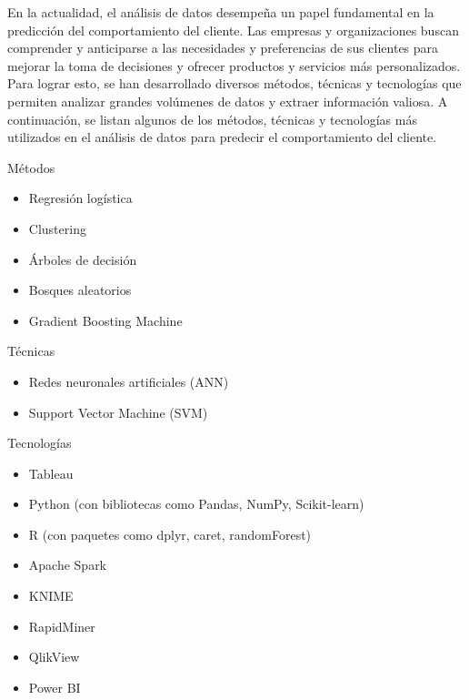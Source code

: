 En la actualidad, el análisis de datos desempeña un papel fundamental en la predicción del comportamiento del cliente. Las empresas y organizaciones buscan comprender y anticiparse a las necesidades y preferencias de sus clientes para mejorar la toma de decisiones y ofrecer productos y servicios más personalizados. Para lograr esto, se han desarrollado diversos métodos, técnicas y tecnologías que permiten analizar grandes volúmenes de datos y extraer información valiosa. 
A continuación, se listan algunos de los métodos, técnicas y tecnologías más utilizados en el análisis de datos para predecir el comportamiento del cliente.

Métodos 
\begin{itemize}
    \item Regresión logística
    \item Clustering
    \item Árboles de decisión
    \item Bosques aleatorios
    \item Gradient Boosting Machine
\end{itemize}

Técnicas 
\begin{itemize}
    \item Redes neuronales artificiales (ANN)
    \item Support Vector Machine (SVM)
\end{itemize}

Tecnologías 
\begin{itemize}
    \item Tableau
    \item Python (con bibliotecas como Pandas, NumPy, Scikit-learn)
    \item R (con paquetes como dplyr, caret, randomForest)
    \item Apache Spark
    \item KNIME
    \item RapidMiner
    \item QlikView
    \item Power BI
\end{itemize}
